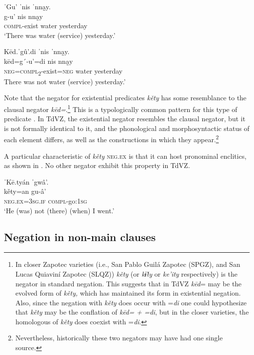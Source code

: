 \documentclass[output=paper,colorlinks=true, citecolor=brown]{langscibook}
\begin{document}
\ea\label{ex:zap:49} 
    \glll ˈGu’ ˈnis ˈnna̰y.\\ 
           g-u’ nis nna̰y\\
           \textsc{compl}{}-exist water yesterday\\
    \glt  ‘There was water (service) yesterday.’
\z 

\ea\label{ex:zap:50} 
    \glll Kēd.ˈgû’.di ˈnis ˈnna̰y.\\ 
          kēd=g´-u’=di nis nna̰y \\
          \textsc{neg}=\textsc{compl}\textsc{\textsubscript{2}}{}-exist=\textsc{neg} water yesterday\\
    \glt  There was not water (service) yesterday.’
\z 

Note that the negator for existential predicates \textit{kěty} has some resemblance to the clausal negator \textit{kēd=}.\footnote{In closer Zapotec varieties (i.e., San Pablo Guilá Zapotec (SPGZ), and San Lucas Quiaviní Zapotec (SLQZ)) \textit{kěty} (or \textit{kɨ̌ty} or \textit{ke’ity} respectively) is the negator in standard negation. This suggests that in TdVZ \textit{kēd}= may be the evolved form of \textit{kěty,} which has maintained its form in existential negation. Also, since the negation with \textit{kěty} does occur with =\textit{di} one could hypothesize that \textit{kěty} may be the conflation of \textit{kēd= + =di}, but in the closer varieties, the homologous of \textit{kěty} does coexist with =\textit{di}.}
This is a typologically common pattern for this type of predicate \citep{Veselinova2013neg.exist}. In TdVZ, the existential negator resembles the clausal negator, but it is not formally identical to it, and the phonological and morphosyntactic status of each element differs, as well as the constructions in which they appear.\footnote{Nevertheless, historically these two negators may have had one single source.} 

A particular characteristic of \textit{kěty} \textsc{neg.ex} is that it can host pronominal enclitics, as shown in . No other negator exhibit this property in TdVZ.

\ea\label{ex:zap:51} 
    \glll ˈKē.tyán ˈgwâ’.\\ 
          kěty=an gu-{â’}\\
          \textsc{neg.ex}=\textsc{3sg.if} \textsc{compl}{}-go:\textsc{1sg}\\
    \glt ‘He (was) not (there) (when) I went.’
\z 

\subsection{Negation in non-main clauses}\label{sec:zap:2.4}
\end{document}
